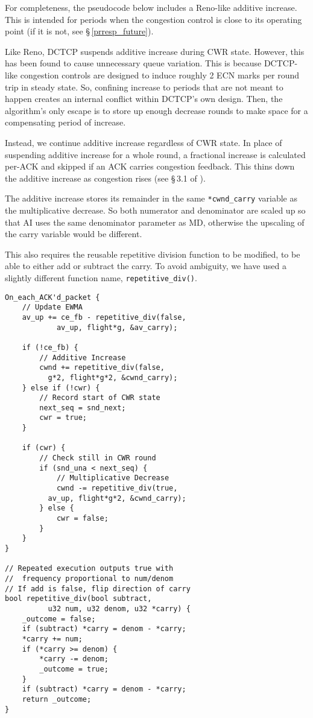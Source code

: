 For completeness, the pseudocode below includes a Reno-like additive increase. This is intended for periods when the congestion control is close to its operating point (if it is not, see \S\,\ref{prresp_future}).

Like Reno, DCTCP suspends additive increase during CWR state. However, this has been found to cause unnecessary queue variation. This is because DCTCP-like congestion controls are designed to induce roughly 2 ECN marks per round trip in steady state. So, confining increase to periods that are not meant to happen creates an internal conflict within DCTCP's own design. Then, the algorithm's only escape is to store up enough decrease rounds to make space for a compensating period of increase.

Instead, we continue additive increase regardless of CWR state. In place of suspending additive increase for a whole round, a fractional increase is calculated per-ACK and skipped if an ACK carries congestion feedback. This thins down the additive increase as congestion rises (see \S\,3.1 of \cite{Briscoe17a:CC_Tensions_TR}).

The additive increase stores its remainder in the same \texttt{*cwnd\_carry} variable as the multiplicative decrease. So both numerator and denominator are scaled up so that AI uses the same denominator parameter as MD, otherwise the upscaling of the carry variable would be different.

This also requires the reusable repetitive division function to be modified, to be able to either add or subtract the carry. To avoid ambiguity, we have used a slightly different function name, \texttt{repetitive\_div()}.

\begin{verbatim}
On_each_ACK'd_packet {
    // Update EWMA
    av_up += ce_fb - repetitive_div(false,
            av_up, flight*g, &av_carry);

    if (!ce_fb) {
        // Additive Increase
        cwnd += repetitive_div(false,
          g*2, flight*g*2, &cwnd_carry);
    } else if (!cwr) {
        // Record start of CWR state
        next_seq = snd_next;
        cwr = true;
    }

    if (cwr) {
        // Check still in CWR round
        if (snd_una < next_seq) {
            // Multiplicative Decrease
            cwnd -= repetitive_div(true,
          av_up, flight*g*2, &cwnd_carry);
        } else {
            cwr = false;
        }
    }
}

// Repeated execution outputs true with 
//  frequency proportional to num/denom
// If add is false, flip direction of carry
bool repetitive_div(bool subtract, 
          u32 num, u32 denom, u32 *carry) {
    _outcome = false;
    if (subtract) *carry = denom - *carry;
    *carry += num;
    if (*carry >= denom) {
        *carry -= denom;
        _outcome = true;
    }
    if (subtract) *carry = denom - *carry;
    return _outcome;
}
\end{verbatim}

